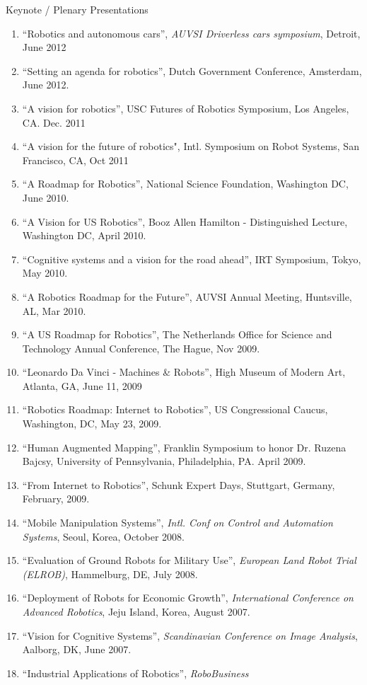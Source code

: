 \documentclass{article}
\begin{document}
\begin{cv}
\begin{cvlist}{Keynote / Plenary Presentations}
\begin{enumerate}
  \item ``Robotics and autonomous cars'', {\em AUVSI Driverless cars symposium}, Detroit, June 2012
  \item ``Setting an agenda for robotics'', Dutch Government  Conference, Amsterdam, June 2012.
  \item ``A vision for robotics'', USC Futures of Robotics Symposium, Los Angeles, CA.  Dec. 2011
  \item ``A vision for the future of robotics", Intl. Symposium on Robot Systems, San Francisco, CA, Oct 2011
  \item ``A Roadmap for Robotics'', National Science Foundation,  Washington DC, June 2010.
  \item ``A Vision for US Robotics'', Booz Allen Hamilton -  Distinguished Lecture, Washington DC, April 2010.
  \item ``Cognitive systems and a vision for the road ahead'', IRT  Symposium, Tokyo, May 2010.
  \item ``A Robotics Roadmap for the Future'', AUVSI Annual Meeting, Huntsville, AL, Mar 2010.
  \item ``A US Roadmap for Robotics'', The Netherlands Office for Science and Technology Annual Conference, The Hague, Nov 2009.
  \item ``Leonardo Da Vinci - Machines \& Robots'', High Museum of Modern Art, Atlanta, GA, June 11, 2009
  \item ``Robotics Roadmap: Internet to Robotics'', US Congressional Caucus, Washington, DC, May 23, 2009.
  \item ``Human Augmented Mapping'', Franklin Symposium to honor Dr. Ruzena Bajcsy, University of Pennsylvania, Philadelphia,
    PA. April 2009.
  \item ``From Internet to Robotics'', Schunk Expert Days, Stuttgart, Germany, February, 2009.
  \item ``Mobile Manipulation Systems'', {\em Intl. Conf on Control
    and Automation Systems}, Seoul, Korea, October 2008.
  \item ``Evaluation of Ground Robots for Military Use'', {\em
    European Land Robot Trial (ELROB)}, Hammelburg, DE, July 2008.
  \item ``Deployment of Robots for Economic Growth'', {\em
    International Conference on Advanced Robotics}, Jeju Island,
    Korea, August 2007.
  \item ``Vision for Cognitive Systems'', {\em Scandinavian Conference
    on Image Analysis}, Aalborg, DK, June 2007.
  \item ``Industrial Applications of Robotics'', {\em RoboBusiness
}
\end{enumerate}
\end{cvlist}
\end{cv}
\end{document}
